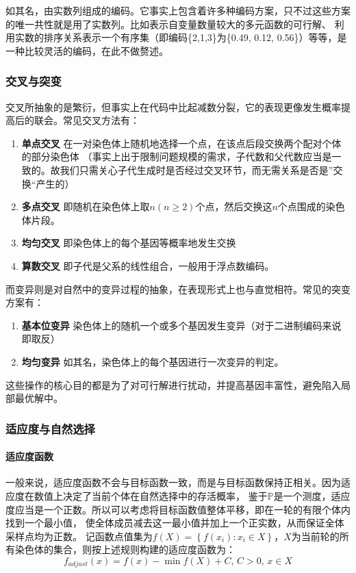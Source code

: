 \documentclass{ctexart}
\begin{document}
如其名，由实数列组成的编码。它事实上包含着许多种编码方案，只不过这些方案的唯一共性就是用了实数列。比如表示自变量数量较大的多元函数的可行解、
利用实数的排序关系表示一个有序集（即编码\{2,1,3\}为\{0.49, 0.12, 0.56\}）等等，是一种比较灵活的编码，在此不做赘述。

\subsubsection{交叉与突变}

交叉所抽象的是繁衍，但事实上在代码中比起减数分裂，它的表现更像发生概率提高后的联会。常见交叉方法有：
\begin{enumerate}
    \item \textbf{单点交叉} 在一对染色体上随机地选择一个点，在该点后段交换两个配对个体的部分染色体
    （事实上出于限制问题规模的需求，子代数和父代数应当是一致的。故我们只需关心子代生成时是否经过交叉环节，而无需关系是否是”交换“产生的）
    \item \textbf{多点交叉} 即随机在染色体上取$n(n\geq 2)$个点，然后交换这$n$个点围成的染色体片段。
    \item \textbf{均匀交叉} 即染色体上的每个基因等概率地发生交换
    \item \textbf{算数交叉} 即子代是父系的线性组合，一般用于浮点数编码。
\end{enumerate}
而变异则是对自然中的变异过程的抽象，在表现形式上也与直觉相符。常见的突变方案有：
\begin{enumerate}
    \item \textbf{基本位变异} 染色体上的随机一个或多个基因发生变异（对于二进制编码来说即取反）
    \item \textbf{均匀变异} 如其名，染色体上的每个基因进行一次变异的判定。
\end{enumerate}
这些操作的核心目的都是为了对可行解进行扰动，并提高基因丰富性，避免陷入局部最优解中。

\subsubsection{适应度与自然选择}

\paragraph{适应度函数}
一般来说，适应度函数不会与目标函数一致，而是与目标函数保持正相关。因为适应度在数值上决定了当前个体在自然选择中的存活概率，
鉴于$\mathbb{P} $是一个测度，适应度应当是一个正数。所以可以考虑将目标函数值整体平移，即在一轮的有限个体内找到一个最小值，
使全体成员减去这一最小值并加上一个正实数，从而保证全体采样点均为正数。
记函数点值集为$f(X)=\left\{f(x_i):x_i \in X\right\} $，$X$为当前轮的所有染色体的集合，则按上述规则构建的适应度函数为：
\[f_{adjust}(x)=f(x)-\min f(X) + C,\, C > 0,\, x \in X\]
\end{document}
